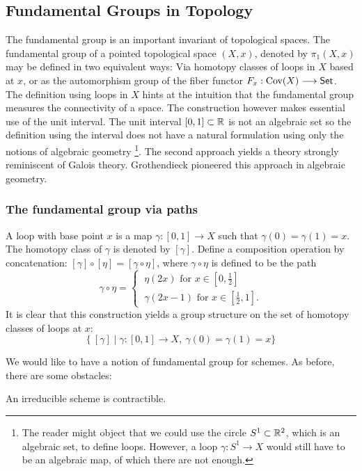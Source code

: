 \subsection{Fundamental Groups in Topology}
The fundamental group is an important invariant of topological spaces. The fundamental group of a pointed topological space $(X,x)$, denoted by $\pi_1(X,x)$ may be defined in two equivalent ways: Via homotopy classes of loops in $X$ based at $x$, or as the automorphism group of the fiber functor $F_x: \text{Cov}(X) \longrightarrow \mathsf{Set}$. The definition using loops in $X$ hints at the intuition that the fundamental group measures the connectivity of a space. The construction however makes essential use of the unit interval. The unit interval $[0,1] \subset \mathbb{R}$ is not an algebraic set so the definition using the interval does not have a natural formulation using only the notions of algebraic geometry \footnote{The reader might object that we could use the circle $S^1 \subset \mathbb{R}^2$, which is an algebraic set, to define loops. However, a loop $\gamma \colon S^1 \to X$ would still have to be an algebraic map, of which there are not enough.}. The second approach yields a theory strongly reminiscent of Galois theory. Grothendieck pioneered this approach in algebraic geometry.

\subsubsection{The fundamental group via paths}
A loop with base point $x$ is a map $\gamma : [0,1] \to X$ such that $\gamma(0) = \gamma(1) = x$. The homotopy class of $\gamma $ is denoted by $[\gamma]$. Define a composition operation by concatenation: $[\gamma] \circ [\eta] = [\gamma \circ \eta]$, where $\gamma \circ \eta$ is defined to be the path
\[
	\gamma \circ \eta =
	\begin{cases}
		\ \eta(2x) \text{ for } x \in [0, \tfrac{1}{2}] \\
		\ \gamma(2x - 1) \text{ for } x \in [\tfrac{1}{2}, 1].
	\end{cases}
\]
It is clear that this construction yields a group structure on the set of homotopy classes of loops at $x$:
\[
	\{\ [\gamma] \mid \gamma : [0,1] \to X,\ \gamma(0) = \gamma(1) = x \}
\]

We would like to have a notion of fundamental group for schemes. As before, there are some obstacles:

\begin{proposition}\label{scheme_contractible}
	An irreducible scheme is contractible.
\end{proposition}


